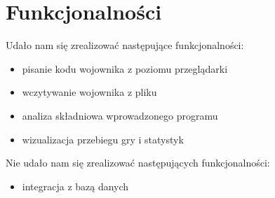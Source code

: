 \chapter{Funkcjonalności}
Udało nam się zrealizować następujące funkcjonalności:
\begin{itemize}
\item pisanie kodu wojownika z poziomu przeglądarki
\item wczytywanie wojownika z pliku
\item analiza składniowa wprowadzonego programu
\item wizualizacja przebiegu gry i statystyk
\end{itemize}
Nie udało nam się zrealizować następujących funkcjonalności:
\begin{itemize}
\item integracja z bazą danych
\end{itemize}